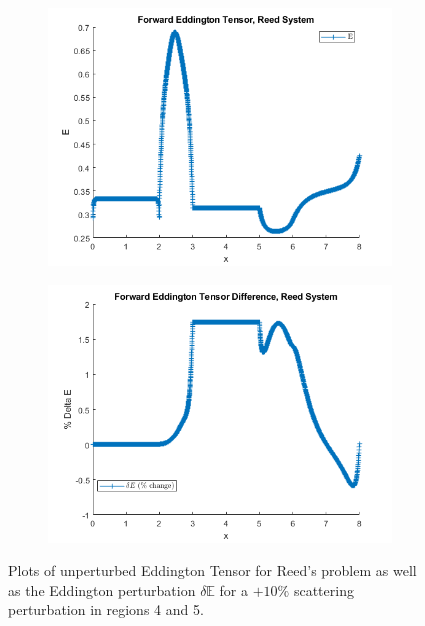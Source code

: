 \documentclass[12pt]{report}
\newcommand{\Edd}{\mathbb{E}}
\begin{document}
\begin{figure}[H]
\centering
\begin{subfigure}{.5\textwidth}
  \centering
  \includegraphics[width=.98\linewidth]{figures2/7E.png}
\end{subfigure}%
\begin{subfigure}{.5\textwidth}
  \centering
  \includegraphics[width=.98\linewidth]{figures2/7deltaE.png}
\end{subfigure}
\caption{Plots of unperturbed Eddington Tensor for Reed's problem as well as the Eddington perturbation $\delta \Edd$ for a $+10 \%$ scattering perturbation in regions 4 and 5.}
\label{fig:Edd4}
\end{figure}
\end{document}
